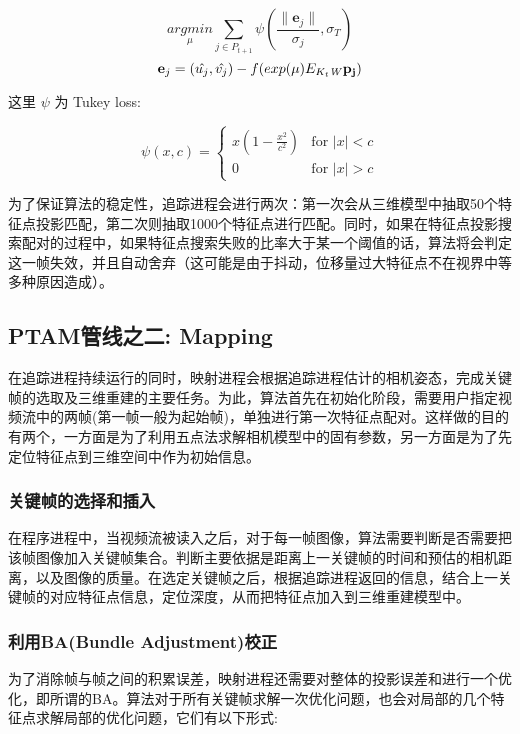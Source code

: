 \begin{equation}
\label{eq:post_update}
\underset{\mu}{argmin} \sum_{j\in P_{t+1}} \psi( \frac{\lVert\mathbf{e}_j\rVert}{\sigma_j} , \sigma_T)
\end{equation}
\begin{equation}
\mathbf{e}_j= (\hat{u_j},\hat{v_j})- f(exp(\mu)E_{K_{t}\mathit{W}} \mathbf{p_j})
\end{equation}

这里 $\psi$ 为 Tukey loss:

\begin{equation}
\psi(x,c)= 
\begin{cases}
x(1-\frac{x^2}{c^2}) & \text{for }|x|<c \\
0  &  \text{for }|x|>c
\end{cases}
\end{equation}

为了保证算法的稳定性，追踪进程会进行两次：第一次会从三维模型中抽取50个特征点投影匹配，第二次则抽取1000个特征点进行匹配。同时，如果在特征点投影搜索配对的过程中，如果特征点搜索失败的比率大于某一个阈值的话，算法将会判定这一帧失效，并且自动舍弃（这可能是由于抖动，位移量过大特征点不在视界中等多种原因造成）。


\subsection{PTAM管线之二: Mapping}

在追踪进程持续运行的同时，映射进程会根据追踪进程估计的相机姿态，完成关键帧的选取及三维重建的主要任务。为此，算法首先在初始化阶段，需要用户指定视频流中的两帧(第一帧一般为起始帧)，单独进行第一次特征点配对。这样做的目的有两个，一方面是为了利用五点法求解相机模型中的固有参数，另一方面是为了先定位特征点到三维空间中作为初始信息。

\subsubsection{关键帧的选择和插入}
在程序进程中，当视频流被读入之后，对于每一帧图像，算法需要判断是否需要把该帧图像加入关键帧集合。判断主要依据是距离上一关键帧的时间和预估的相机距离，以及图像的质量。在选定关键帧之后，根据追踪进程返回的信息，结合上一关键帧的对应特征点信息，定位深度，从而把特征点加入到三维重建模型中。

\subsubsection{利用BA(Bundle Adjustment)校正}
为了消除帧与帧之间的积累误差，映射进程还需要对整体的投影误差和进行一个优化，即所谓的BA。算法对于所有关键帧求解一次优化问题，也会对局部的几个特征点求解局部的优化问题，它们有以下形式:

